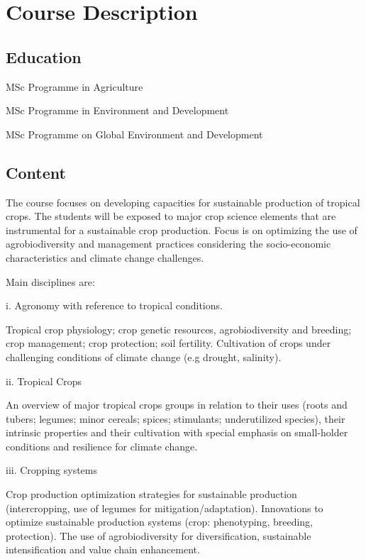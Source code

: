 \chapter*{Course Description}
\setlength{\headheight}{12.71342pt}
\addtolength{\topmargin}{-0.71342pt}

\section*{Education}
MSc Programme in Agriculture

MSc Programme in Environment and Development

MSc Programme on Global Environment and Development

\section*{Content}
The course focuses on developing capacities for sustainable production of tropical crops. The students will be exposed to major crop science elements that are instrumental for a sustainable crop production. Focus is on optimizing the use of agrobiodiversity and management practices considering the socio-economic characteristics and climate change challenges.

\vspace{1em}
Main disciplines are:

\vspace*{0.5em}
i. Agronomy with reference to tropical conditions.

Tropical crop physiology; crop genetic resources, agrobiodiversity and breeding; crop management; crop protection; soil fertility. Cultivation of crops under challenging conditions of climate change (e.g drought, salinity).

\vspace*{0.5em}
ii. Tropical Crops

An overview of major tropical crops groups in relation to their uses (roots and tubers; legumes; minor cereals; spices; stimulants; underutilized species), their intrinsic properties and their cultivation with special emphasis on small-holder conditions and resilience for climate change.

\vspace*{0.5em}
iii. Cropping systems

Crop production optimization strategies for sustainable production (intercropping, use of legumes for mitigation/adaptation). Innovations to optimize sustainable production systems (crop: phenotyping, breeding, protection). The use of agrobiodiversity for diversification, sustainable intensification and value chain enhancement.


